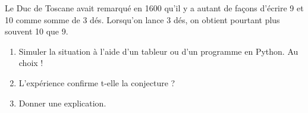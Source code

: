 
Le Duc de Toscane avait remarqué en 1600 qu'il y a autant de façons d'écrire 9 et 10 comme somme de 3 dés. Lorsqu'on lance 3 dés, on obtient pourtant plus souvent 10 que 9.
\begin{enumerate}
\item Simuler la situation à l'aide d'un tableur ou d'un programme en Python. Au choix !
\item L'expérience confirme t-elle la conjecture ?
\item Donner une explication.
\end{enumerate}